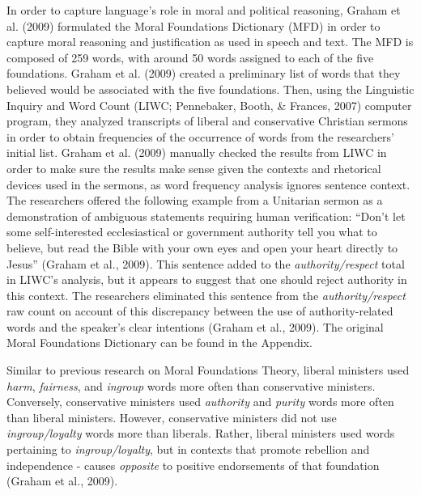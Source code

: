 \documentclass[english,,man]{apa6}
\begin{document}
In order to capture language's role in moral and political reasoning,
Graham et al. (2009) formulated the Moral Foundations Dictionary (MFD)
in order to capture moral reasoning and justification as used in speech
and text. The MFD is composed of 259 words, with around 50 words
assigned to each of the five foundations. Graham et al. (2009) created a
preliminary list of words that they believed would be associated with
the five foundations. Then, using the Linguistic Inquiry and Word Count
(LIWC; Pennebaker, Booth, \& Frances, 2007) computer program, they
analyzed transcripts of liberal and conservative Christian sermons in
order to obtain frequencies of the occurrence of words from the
researchers' initial list. Graham et al. (2009) manually checked the
results from LIWC in order to make sure the results make sense given the
contexts and rhetorical devices used in the sermons, as word frequency
analysis ignores sentence context. The researchers offered the following
example from a Unitarian sermon as a demonstration of ambiguous
statements requiring human verification: \enquote{Don't let some
self-interested ecclesiastical or government authority tell you what to
believe, but read the Bible with your own eyes and open your heart
directly to Jesus} (Graham et al., 2009). This sentence added to the
\emph{authority/respect} total in LIWC's analysis, but it appears to
suggest that one should reject authority in this context. The
researchers eliminated this sentence from the \emph{authority/respect}
raw count on account of this discrepancy between the use of
authority-related words and the speaker's clear intentions (Graham et
al., 2009). The original Moral Foundations Dictionary can be found in
the Appendix.

Similar to previous research on Moral Foundations Theory, liberal
ministers used \emph{harm}, \emph{fairness}, and \emph{ingroup} words
more often than conservative ministers. Conversely, conservative
ministers used \emph{authority} and \emph{purity} words more often than
liberal ministers. However, conservative ministers did not use
\emph{ingroup/loyalty} words more than liberals. Rather, liberal
ministers used words pertaining to \emph{ingroup/loyalty}, but in
contexts that promote rebellion and independence - causes
\emph{opposite} to positive endorsements of that foundation (Graham et
al., 2009).
\end{document}

